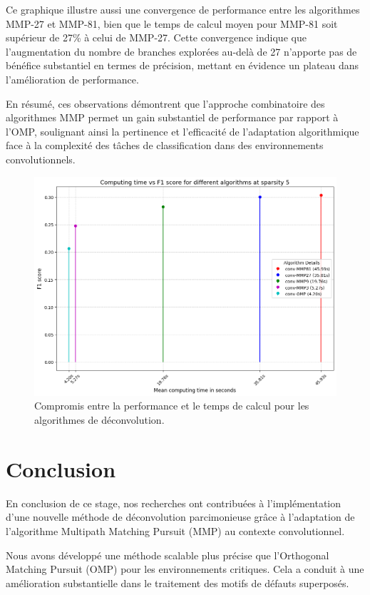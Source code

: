 \documentclass[9pt,a4paper,twoside]{rho}
\begin{document}
Ce graphique illustre aussi une convergence de performance entre les algorithmes MMP-27 et MMP-81, bien que le temps de calcul moyen pour MMP-81 soit supérieur de 27\% à celui de MMP-27. Cette convergence indique que l'augmentation du nombre de branches explorées au-delà de 27 n'apporte pas de bénéfice substantiel en termes de précision, mettant en évidence un plateau dans l'amélioration de performance.

En résumé, ces observations démontrent que l'approche combinatoire des algorithmes MMP permet un gain substantiel de performance par rapport à l'OMP, soulignant ainsi la pertinence et l'efficacité de l'adaptation algorithmique face à la complexité des tâches de classification dans des environnements convolutionnels.
\begin{figure}[H]
    \centering
    \includegraphics[width=1\linewidth]{images/trade_off_f1.png}
    \caption{Compromis entre la performance et le temps de calcul pour les algorithmes de déconvolution.}
    \label{fig:trade_off_f1}
\end{figure}    

\section{Conclusion}

En conclusion de ce stage, nos recherches ont contribuées à l'implémentation d'une nouvelle méthode de déconvolution parcimonieuse grâce à l'adaptation de l'algorithme Multipath Matching Pursuit (MMP) au contexte convolutionnel. 

Nous avons développé une méthode scalable plus précise que l'Orthogonal Matching Pursuit (OMP) pour les environnements critiques. Cela a conduit à une amélioration substantielle dans le traitement des motifs de défauts superposés.
\end{document}
